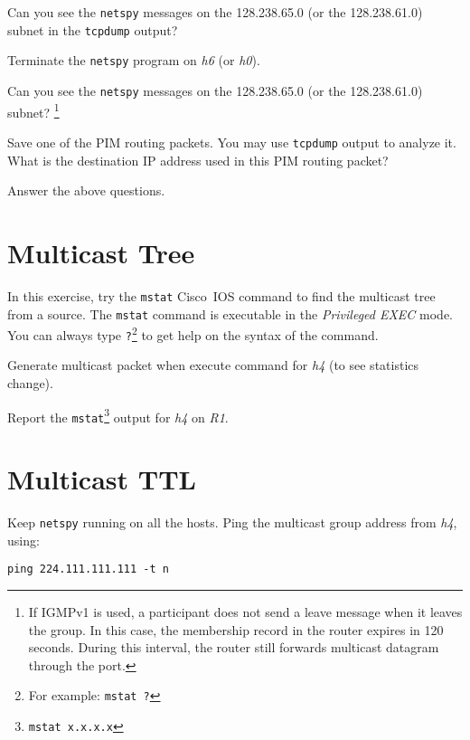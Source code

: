 \documentclass{../UTNetLab}
\begin{document}
    Can you see the \lstinline{netspy} messages on the 128.238.65.0 (or the 128.238.61.0) subnet in the \lstinline{tcpdump} output? 

    Terminate the \lstinline{netspy} program on \textit{h6} (or \textit{h0}).

    Can you see the \lstinline{netspy} messages on the 128.238.65.0 (or the 128.238.61.0) subnet?
    \footnote{If IGMPv1 is used, a participant does not send a leave message when it leaves the group.
    In this case, the membership record in the router expires in 120 seconds.
    During this interval, the router still forwards multicast datagram through the port.} 

    Save one of the PIM routing packets.
    You may use \lstinline{tcpdump} output to analyze it.
    What is the destination IP address used in this PIM routing packet?
    
    \begin{report}
        \item Answer the above questions.
    \end{report}

\section{Multicast Tree}
    In this exercise, try the \lstinline[language={cisco}]{mstat} Cisco~IOS command to find the multicast tree from a source.
    The \lstinline[language={cisco}]{mstat} command is executable in the \textit{Privileged EXEC} mode.
    You can always type \lstinline[language={cisco}]{?}\footnote{For example: \lstinline[language={cisco}]{mstat ?}} to get help on the syntax of the command.

    Generate multicast packet when execute command for \textit{h4} (to see statistics change).

    \begin{report}
        \item Report the \lstinline[language={cisco}]{mstat}\footnote{\lstinline[language={cisco},emph={x}]{mstat x.x.x.x}} output for \textit{h4} on \textit{R1}.
    \end{report}

\section{Multicast TTL}
    Keep \lstinline{netspy} running on all the hosts.
    Ping the multicast group address from \textit{h4}, using: 
    \begin{lstlisting}[emph={n}]
ping 224.111.111.111 -t n
    \end{lstlisting}
\end{document}
